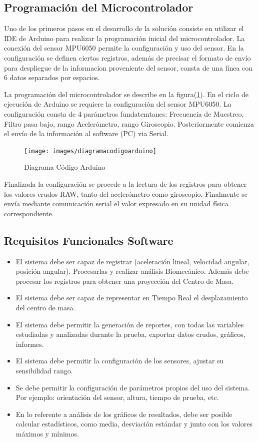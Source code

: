 \documentclass[12pt,a4paper]{article}
\begin{document}
\subsection{Programación del Microcontrolador}
Uno de los primeros pasos en el desarrollo de la solución consiste en utilizar el IDE de Arduino para realizar la programación inicial del microcontrolador. La conexión del sensor MPU6050 permite la configuración y uso del sensor.
En la configuración se definen ciertos registros, además de precisar el formato de envío para despliegue de la informacion proveniente del sensor, consta de una línea con 6 datos separados por espacios.

La programación del microcontrolador se describe en la figura(\ref{fig:arduinocode}).
En el ciclo de ejecución de Arduino se requiere la configuración del sensor MPU6050. La configuración consta de 4 parámetros fundatemtanes: Frecuencia de Muestreo, Filtro pasa bajo, rango Acelerómetro, rango Giroscopio. Posteriormente comienza el envío de la información al software (PC) via Serial.

\begin{figure}[H]
	\centering
	\texttt{[image: images/diagramacodigoarduino]}
	\caption{Diagrama Código Arduino}
	\label{fig:arduinocode}
\end{figure}

Finalizada la configuración se procede a la lectura de los registros para obtener los valores crudos RAW, tanto del acelerómetro como giroscopio. Finalmente se envía mediante comunicación serial el valor expresado en su unidad física correspondiente.

\subsection{Requisitos Funcionales Software}
\begin{itemize}
	\item El sistema debe ser capaz de registrar (aceleración lineal, velocidad angular, posición angular). Procesarlas y realizar análisis Biomecánico. Además debe procesar los registros para obtener una proyección del Centro de Masa.
	\item El sistema debe ser capaz de representar en Tiempo Real el desplazamiento del centro de masa.
	\item El sistema debe permitir la generación de reportes, con todas las variables estudiadas y analizadas durante la prueba, exportar datos crudos, gráficos, informes.
	\item El sistema debe permitir la configuración de los sensores, ajustar su sensibilidad rango.
	\item Se debe permitir la configuración de parámetros propios del uso del sistema. Por ejemplo: orientación del sensor, altura, tiempo de prueba, etc.
	\item En lo referente a análisis de los gráficos de resultados, debe ser posible calcular estadísticos, como media, desviación estándar y junto con los valores máximos y mínimos.
\end{itemize} 
\end{document}
